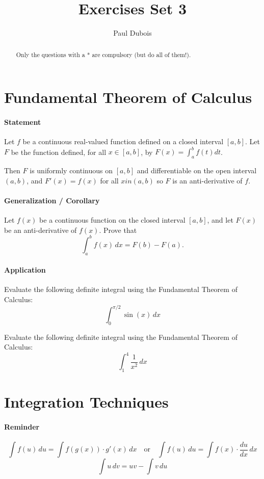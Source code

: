 \documentclass[]{article}
\title{Exercises Set 3}
\author{Paul Dubois}
\begin{document}
	\maketitle
	
	\begin{abstract}
		Only the questions with a * are compulsory (but do all of them!).
	\end{abstract}
	
	\section{Fundamental Theorem of Calculus}
	\paragraph{Statement}
	Let $f$ be a continuous real-valued function defined on a closed interval $\left[ a,b \right]$.
	Let $F$ be the function defined, for all $x \in \left[ a,b \right]$, by $F(x) = \int_a^b f(t) dt$.
	
	Then $F$ is uniformly continuous on $\left[ a,b \right]$ and differentiable on the open interval $\left( a,b \right)$, and $F'(x) = f(x)$ for all $x in \left( a,b \right)$ so $F$ is an anti-derivative of $f$.
	
	\paragraph{Generalization / Corollary}
	Let \( f(x) \) be a continuous function on the closed interval \([a, b]\), and let \( F(x) \) be an anti-derivative of \( f(x) \).
	Prove that
	\[
	\int_a^b f(x) \, dx = F(b) - F(a).
	\]
	
	\paragraph{Application}
	Evaluate the following definite integral using the Fundamental Theorem of Calculus:
	\[
	\int_0^{\pi/2} \sin(x) \, dx
	\]
	
	Evaluate the following definite integral using the Fundamental Theorem of Calculus:
	\[
	\int_1^4 \frac{1}{x^2} \, dx
	\]
	
	
	\section{Integration Techniques}
	\paragraph{Reminder}
	$$\int f(u) \, du = \int f(g(x)) \cdot g'(x) \, dx \quad \text {or} \quad \int f(u) \, du = \int f(x) \cdot \frac{du}{dx} \, dx$$
	$$\int u \, dv = uv - \int v \, du$$
	
\end{document}
